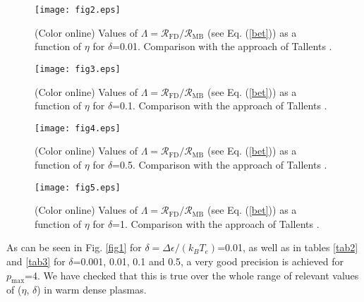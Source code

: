 \documentclass[a4paper,10pt]{article}
\begin{document}
\begin{figure*}[ht]
\vspace{1cm}
\begin{center}
\texttt{[image: fig2.eps]}
\end{center}
\caption{(Color online) Values of $\Lambda=\mathcal{R}_{\mathrm{FD}}/\mathcal{R}_{\mathrm{MB}}$ (see Eq. (\ref{bet})) as a function of $\eta$ for $\delta$=0.01. Comparison with the approach of Tallents \cite{TALLENTS16}.}\label{fig2}
\vspace{1cm}
\end{figure*}

\begin{figure*}[ht]
\vspace{1cm}
\begin{center}
\texttt{[image: fig3.eps]}
\end{center}
\caption{(Color online) Values of $\Lambda=\mathcal{R}_{\mathrm{FD}}/\mathcal{R}_{\mathrm{MB}}$ (see Eq. (\ref{bet})) as a function of $\eta$ for $\delta$=0.1. Comparison with the approach of Tallents \cite{TALLENTS16}.}\label{fig3}
\vspace{1cm}
\end{figure*}

\begin{figure*}[ht]
\vspace{1cm}
\begin{center}
\texttt{[image: fig4.eps]}
\end{center}
\caption{(Color online) Values of $\Lambda=\mathcal{R}_{\mathrm{FD}}/\mathcal{R}_{\mathrm{MB}}$ (see Eq. (\ref{bet})) as a function of $\eta$ for $\delta$=0.5. Comparison with the approach of Tallents \cite{TALLENTS16}.}\label{fig4}
\vspace{1cm}
\end{figure*}

\begin{figure*}[ht]
\vspace{1cm}
\begin{center}
\texttt{[image: fig5.eps]}
\end{center}
\caption{(Color online) Values of $\Lambda=\mathcal{R}_{\mathrm{FD}}/\mathcal{R}_{\mathrm{MB}}$ (see Eq. (\ref{bet})) as a function of $\eta$ for $\delta$=1. Comparison with the approach of Tallents \cite{TALLENTS16}.}\label{fig5}
\vspace{1cm}
\end{figure*}

As can be seen in Fig. \ref{fig1} for $\delta=\Delta \epsilon/\left(k_BT_e\right)$=0.01, as well as in tables \ref{tab2} and \ref{tab3} for $\delta$=0.001, 0.01, 0.1 and 0.5, a very good precision is achieved for $p_{\mathrm{max}}$=4. We have checked that this is true over the whole range of relevant values of ($\eta$, $\delta$) in warm dense plasmas.
\end{document}
